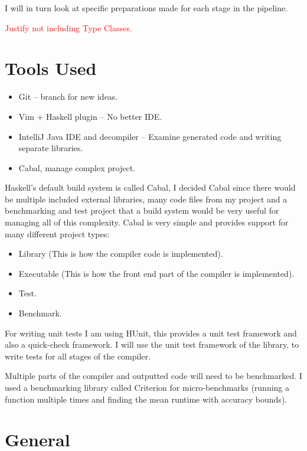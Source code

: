 \documentclass[float=false, crop=false]{standalone}
\begin{document}
I will in turn look at specific preparations made for each stage in the pipeline.

\textcolor{red}{Justify not including Type Classes.}

\section{Tools Used}

\begin{itemize}
  \item Git -- branch for new ideas.
  \item Vim + Haskell plugin -- No better IDE.
  \item IntelliJ Java IDE and decompiler -- Examine generated code and writing separate libraries.
  \item Cabal, manage complex project.
\end{itemize}  

  Haskell's default build system is called Cabal\cite{cabal}, I 
  decided Cabal 
  since there would be multiple included external libraries,
  many code files from my project and a benchmarking and test project
  that a build system would be very useful for managing all of this
  complexity. Cabal is very simple and provides support
  for many different project types:
  \begin{itemize}
    \item Library (This is how the compiler code is implemented).

    \item Executable (This is how the front end part of the compiler is 
      implemented).

    \item Test.

    \item Benchmark.
  \end{itemize}

  For writing unit tests I am using HUnit\cite{hunit},
  this provides a unit test framework and 
  also a quick-check framework. 
  I will use the unit test framework of the library, 
  to write tests for all stages of the compiler.

  Multiple parts of the compiler and outputted code will
  need to be benchmarked. I used a benchmarking library called
  Criterion\cite{criterion} for micro-benchmarks (running a function
  multiple times and finding the mean runtime with accuracy bounds).

\section{General}
\end{document}
